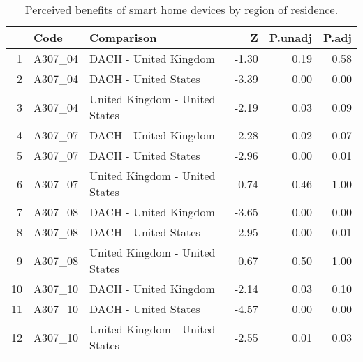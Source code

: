 \begin{table}[ht]
\centering
\begin{tabular}{rllrrr}
  \hline
 & Code & Comparison & Z & P.unadj & P.adj \\ 
  \hline
1 & A307\_04 & DACH - United Kingdom & -1.30 & 0.19 & 0.58 \\ 
  2 & A307\_04 & DACH - United States & -3.39 & 0.00 & 0.00 \\ 
  3 & A307\_04 & United Kingdom - United States & -2.19 & 0.03 & 0.09 \\ 
   \hline
4 & A307\_07 & DACH - United Kingdom & -2.28 & 0.02 & 0.07 \\ 
  5 & A307\_07 & DACH - United States & -2.96 & 0.00 & 0.01 \\ 
  6 & A307\_07 & United Kingdom - United States & -0.74 & 0.46 & 1.00 \\ 
   \hline
7 & A307\_08 & DACH - United Kingdom & -3.65 & 0.00 & 0.00 \\ 
  8 & A307\_08 & DACH - United States & -2.95 & 0.00 & 0.01 \\ 
  9 & A307\_08 & United Kingdom - United States & 0.67 & 0.50 & 1.00 \\ 
   \hline
10 & A307\_10 & DACH - United Kingdom & -2.14 & 0.03 & 0.10 \\ 
  11 & A307\_10 & DACH - United States & -4.57 & 0.00 & 0.00 \\ 
  12 & A307\_10 & United Kingdom - United States & -2.55 & 0.01 & 0.03 \\ 
   \hline
\end{tabular}
\caption{Perceived benefits of smart home devices by region of residence. } 
\end{table}
